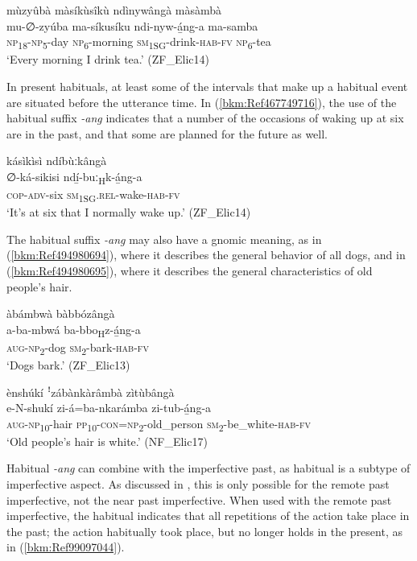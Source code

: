 \ea
\label{bkm:Ref99096243}
mùzyûbà màsíkùsîkù ndìnywângà màsàmbà\\
\gll mu-∅-zyúba  ma-síkusíku    ndi-nyw-á̲ng-a    ma-samba\\
\textsc{np}\textsubscript{18}-\textsc{np}\textsubscript{5}-day  \textsc{np}\textsubscript{6}-morning    \textsc{sm}\textsubscript{1SG}-drink-\textsc{hab}-\textsc{fv}  \textsc{np}\textsubscript{6}-tea\\
\glt ‘Every morning I drink tea.’ (ZF\_Elic14)
\z

In present habituals, at least some of the intervals that make up a habitual event are situated before the utterance time. In (\ref{bkm:Ref467749716}), the use of the habitual suffix \textit{-ang} indicates that a number of the occasions of waking up at six are in the past, and that some are planned for the future as well.

\ea
\label{bkm:Ref467749716}
kásìkìsì ndíbùːkângà\\
\gll ∅-ká-sikisi    ndí̲-buː\textsubscript{H}k-á̲ng-a\\
\textsc{cop}-\textsc{adv}-six    \textsc{sm}\textsubscript{1SG}.\textsc{rel}-wake-\textsc{hab}-\textsc{fv}\\
\glt ‘It’s at six that I normally wake up.’ (ZF\_Elic14)
\z

The habitual suffix \textit{-ang} may also have a gnomic meaning, as in (\ref{bkm:Ref494980694}), where it describes the general behavior of all dogs, and in (\ref{bkm:Ref494980695}), where it describes the general characteristics of old people’s hair.

\ea
\label{bkm:Ref494980694}
àbámbwà bàbbózângà\\
\gll a-ba-mbwá    ba-bbo\textsubscript{H}z-á̲ng-a\\
\textsc{aug}-\textsc{np}\textsubscript{2}-dog  \textsc{sm}\textsubscript{2}-bark-\textsc{hab}-\textsc{fv}\\
\glt ‘Dogs bark.’ (ZF\_Elic13)
\z

\ea
\label{bkm:Ref494980695}
ènshúkí ꜝzábànkàrâmbà zìtùbângà\\
\gll e-N-shukí    zi-á=ba-nkarámba    zi-tub-á̲ng-a\\
\textsc{aug}-\textsc{np}\textsubscript{10}-hair  \textsc{pp}\textsubscript{10}-\textsc{con}=\textsc{np}\textsubscript{2}-old\_person  \textsc{sm}\textsubscript{2}-be\_white-\textsc{hab}-\textsc{fv}\\
\glt ‘Old people’s hair is white.’ (NF\_Elic17)
\z

Habitual \textit{-ang} can combine with the imperfective past, as habitual is a subtype of imperfective aspect. As discussed in , this is only possible for the remote past imperfective, not the near past imperfective. When used with the remote past imperfective, the habitual indicates that all repetitions of the action take place in the past; the action habitually took place, but no longer holds in the present, as in (\ref{bkm:Ref99097044}).

